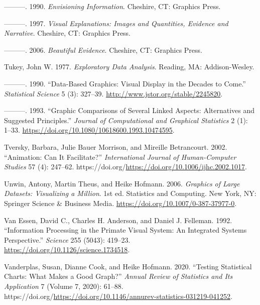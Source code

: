 \documentclass[
  letterpaper,
  DIV=11,
  numbers=noendperiod]{scrreprt}
\newlength{\cslhangindent}
\newenvironment{CSLReferences}[2] %
 {\begin{list}{}{%
  \setlength{\itemindent}{0pt}
  \setlength{\leftmargin}{0pt}
  \setlength{\parsep}{0pt}
  \ifodd #1
   \setlength{\leftmargin}{\cslhangindent}
   \setlength{\itemindent}{-1\cslhangindent}
  \fi
  \setlength{\itemsep}{#2\baselineskip}}}
 {\end{list}}
\begin{document}
\begin{CSLReferences}{1}{0}
---------. 1990. \emph{Envisioning Information}. Cheshire, CT: Graphics
Press.

---------. 1997. \emph{Visual Explanations: Images and Quantities,
Evidence and Narrative}. Cheshire, CT: Graphics Press.

---------. 2006. \emph{Beautiful Evidence}. Cheshire, CT: Graphics
Press.

Tukey, John W. 1977. \emph{Exploratory Data Analysis}. Reading, MA:
Addison-Wesley.

---------. 1990. {``Data-Based Graphics: Visual Display in the Decades
to Come.''} \emph{Statistical Science} 5 (3): 327--39.
\url{http://www.jstor.org/stable/2245820}.

---------. 1993. {``Graphic Comparisons of Several Linked Aspects:
Alternatives and Suggested Principles.''} \emph{Journal of Computational
and Graphical Statistics} 2 (1): 1--33.
\url{https://doi.org/10.1080/10618600.1993.10474595}.

Tversky, Barbara, Julie Bauer Morrison, and Mireille Betrancourt. 2002.
{``Animation: Can It Facilitate?''} \emph{International Journal of
Human-Computer Studies} 57 (4): 247--62.
https://doi.org/\url{https://doi.org/10.1006/ijhc.2002.1017}.

Unwin, Antony, Martin Theus, and Heike Hofmann. 2006. \emph{Graphics of
Large Datasets: Visualizing a Million}. 1st ed. Statistics and
Computing. New York, NY: Springer Science \& Business Media.
\url{https://doi.org/10.1007/0-387-37977-0}.

Van Essen, David C., Charles H. Anderson, and Daniel J. Felleman. 1992.
{``Information Processing in the Primate Visual System: An Integrated
Systems Perspective.''} \emph{Science} 255 (5043): 419--23.
\url{https://doi.org/10.1126/science.1734518}.

Vanderplas, Susan, Dianne Cook, and Heike Hofmann. 2020. {``Testing
Statistical Charts: What Makes a Good Graph?''} \emph{Annual Review of
Statistics and Its Application} 7 (Volume 7, 2020): 61--88.
https://doi.org/\url{https://doi.org/10.1146/annurev-statistics-031219-041252}.


\end{CSLReferences}
\end{document}
